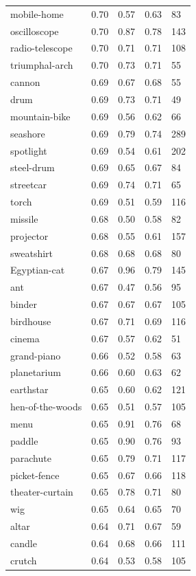 \begin{center}
\begin{longtable}{lllll}
mobile-home & 0.70 & 0.57 & 0.63 & 83 \\
oscilloscope & 0.70 & 0.87 & 0.78 & 143 \\
radio-telescope & 0.70 & 0.71 & 0.71 & 108 \\
triumphal-arch & 0.70 & 0.73 & 0.71 & 55 \\
cannon & 0.69 & 0.67 & 0.68 & 55 \\
drum & 0.69 & 0.73 & 0.71 & 49 \\
mountain-bike & 0.69 & 0.56 & 0.62 & 66 \\
seashore & 0.69 & 0.79 & 0.74 & 289 \\
spotlight & 0.69 & 0.54 & 0.61 & 202 \\
steel-drum & 0.69 & 0.65 & 0.67 & 84 \\
streetcar & 0.69 & 0.74 & 0.71 & 65 \\
torch & 0.69 & 0.51 & 0.59 & 116 \\
missile & 0.68 & 0.50 & 0.58 & 82 \\
projector & 0.68 & 0.55 & 0.61 & 157 \\
sweatshirt & 0.68 & 0.68 & 0.68 & 80 \\
Egyptian-cat & 0.67 & 0.96 & 0.79 & 145 \\
ant & 0.67 & 0.47 & 0.56 & 95 \\
binder & 0.67 & 0.67 & 0.67 & 105 \\
birdhouse & 0.67 & 0.71 & 0.69 & 116 \\
cinema & 0.67 & 0.57 & 0.62 & 51 \\
grand-piano & 0.66 & 0.52 & 0.58 & 63 \\
planetarium & 0.66 & 0.60 & 0.63 & 62 \\
earthstar & 0.65 & 0.60 & 0.62 & 121 \\
hen-of-the-woods & 0.65 & 0.51 & 0.57 & 105 \\
menu & 0.65 & 0.91 & 0.76 & 68 \\
paddle & 0.65 & 0.90 & 0.76 & 93 \\
parachute & 0.65 & 0.79 & 0.71 & 117 \\
picket-fence & 0.65 & 0.67 & 0.66 & 118 \\
theater-curtain & 0.65 & 0.78 & 0.71 & 80 \\
wig & 0.65 & 0.64 & 0.65 & 70 \\
altar & 0.64 & 0.71 & 0.67 & 59 \\
candle & 0.64 & 0.68 & 0.66 & 111 \\
crutch & 0.64 & 0.53 & 0.58 & 105 \\

\end{longtable}
\end{center}
